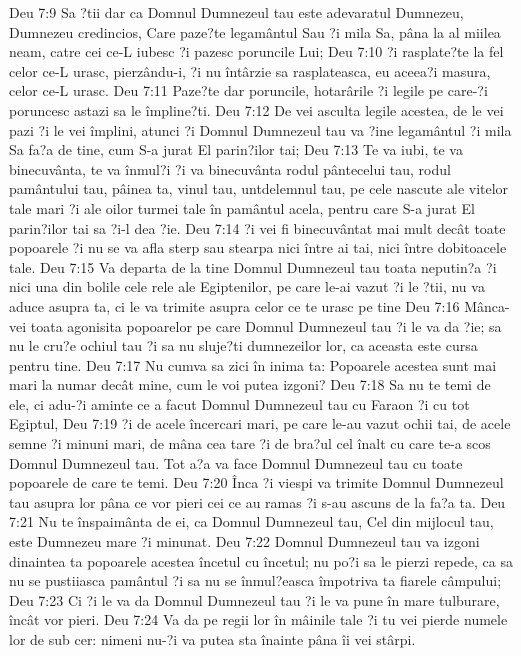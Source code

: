 Deu 7:9  Sa ?tii dar ca Domnul Dumnezeul tau este adevaratul Dumnezeu, Dumnezeu credincios, Care paze?te legamântul Sau ?i mila Sa, pâna la al miilea neam, catre cei ce-L iubesc ?i pazesc poruncile Lui;
Deu 7:10  ?i rasplate?te la fel celor ce-L urasc, pierzându-i, ?i nu întârzie sa rasplateasca, eu aceea?i masura, celor ce-L urasc.
Deu 7:11  Paze?te dar poruncile, hotarârile ?i legile pe care-?i poruncesc astazi sa le împline?ti.
Deu 7:12  De vei asculta legile acestea, de le vei pazi ?i le vei împlini, atunci ?i Domnul Dumnezeul tau va ?ine legamântul ?i mila Sa fa?a de tine, cum S-a jurat El parin?ilor tai;
Deu 7:13  Te va iubi, te va binecuvânta, te va înmul?i ?i va binecuvânta rodul pântecelui tau, rodul pamântului tau, pâinea ta, vinul tau, untdelemnul tau, pe cele nascute ale vitelor tale mari ?i ale oilor turmei tale în pamântul acela, pentru care S-a jurat El parin?ilor tai sa ?i-l dea ?ie.
Deu 7:14  ?i vei fi binecuvântat mai mult decât toate popoarele ?i nu se va afla sterp sau stearpa nici între ai tai, nici între dobitoacele tale.
Deu 7:15  Va departa de la tine Domnul Dumnezeul tau toata neputin?a ?i nici una din bolile cele rele ale Egiptenilor, pe care le-ai vazut ?i le ?tii, nu va aduce asupra ta, ci le va trimite asupra celor ce te urasc pe tine
Deu 7:16  Mânca-vei toata agonisita popoarelor pe care Domnul Dumnezeul tau ?i le va da ?ie; sa nu le cru?e ochiul tau ?i sa nu sluje?ti dumnezeilor lor, ca aceasta este cursa pentru tine.
Deu 7:17  Nu cumva sa zici în inima ta: Popoarele acestea sunt mai mari la numar decât mine, cum le voi putea izgoni?
Deu 7:18  Sa nu te temi de ele, ci adu-?i aminte ce a facut Domnul Dumnezeul tau cu Faraon ?i cu tot Egiptul,
Deu 7:19  ?i de acele încercari mari, pe care le-au vazut ochii tai, de acele semne ?i minuni mari, de mâna cea tare ?i de bra?ul cel înalt cu care te-a scos Domnul Dumnezeul tau. Tot a?a va face Domnul Dumnezeul tau cu toate popoarele de care te temi.
Deu 7:20  Înca ?i viespi va trimite Domnul Dumnezeul tau asupra lor pâna ce vor pieri cei ce au ramas ?i s-au ascuns de la fa?a ta.
Deu 7:21  Nu te înspaimânta de ei, ca Domnul Dumnezeul tau, Cel din mijlocul tau, este Dumnezeu mare ?i minunat.
Deu 7:22  Domnul Dumnezeul tau va izgoni dinaintea ta popoarele acestea încetul cu încetul; nu po?i sa le pierzi repede, ca sa nu se pustiiasca pamântul ?i sa nu se înmul?easca împotriva ta fiarele câmpului;
Deu 7:23  Ci ?i le va da Domnul Dumnezeul tau ?i le va pune în mare tulburare, încât vor pieri.
Deu 7:24  Va da pe regii lor în mâinile tale ?i tu vei pierde numele lor de sub cer: nimeni nu-?i va putea sta înainte pâna îi vei stârpi.
